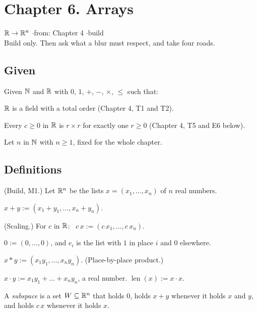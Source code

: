 \newpage

\section*{Chapter 6. Arrays}
\begin{center}
{\normalsize $\mathbb{R} \to \mathbb{R}^n$ \quad$\cdot$\quad from: Chapter 4 \quad$\cdot$\quad build}\\[4pt]
{\small Build only. Then ask what a blur must respect, and take four roads.}
\end{center}

\subsection*{Given}

Given $\mathbb{N}$ and $\mathbb{R}$ with $0$, $1$, $+$, $-$, $\times$, $\le$ such that:
\begin{lines}
\item[\lab{G1}] $\mathbb{R}$ is a field with a total order (Chapter 4, T1 and T2).
\item[\lab{G2}] Every $c \ge 0$ in $\mathbb{R}$ is $r \times r$ for exactly one $r \ge 0$ (Chapter 4, T5 and E6 below).
\end{lines}
Let $n$ in $\mathbb{N}$ with $n \ge 1$, fixed for the whole chapter.

\subsection*{Definitions}

\begin{lines}
\item[\lab{D1}] (Build, M1.) Let $\mathbb{R}^n$ be the lists $x = (x_1, \dots, x_n)$ of $n$ real numbers.
\item[\lab{D2}] $x + y := (x_1 + y_1, \dots, x_n + y_n)$.
\item[\lab{D3}] (Scaling.) For $c$ in $\mathbb{R}$: \ $c\,x := (c\,x_1, \dots, c\,x_n)$.
\item[\lab{D4}] $0 := (0, \dots, 0)$, and $e_i$ is the list with $1$ in place $i$ and $0$ elsewhere.
\item[\lab{D5}] $x \ast y := (x_1 y_1, \dots, x_n y_n)$. \quad (Place-by-place product.)
\item[\lab{D6}] $x \cdot y := x_1 y_1 + \dots + x_n y_n$, a real number. \quad $\operatorname{len}(x) := x \cdot x$.
\item[\lab{D7}] A \emph{subspace} is a set $W \subseteq \mathbb{R}^n$ that holds $0$, holds $x + y$ whenever it holds $x$ and $y$, and holds $c\,x$ whenever it holds $x$.
\end{lines}

